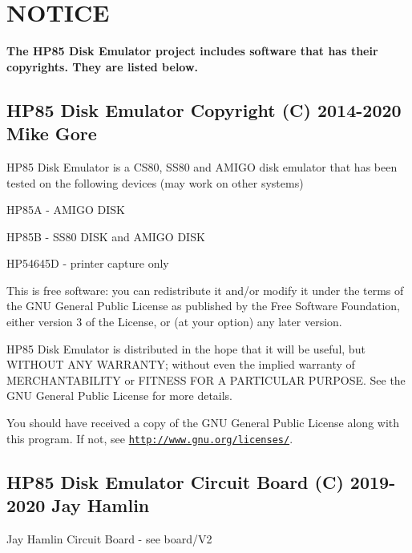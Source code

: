 \hypertarget{index_COPYRIGHT}{}\section{N\+O\+T\+I\+CE}\label{index_COPYRIGHT}
{\bfseries The H\+P85 Disk Emulator project includes software that has their copyrights. They are listed below.}





\subsection*{H\+P85 Disk Emulator Copyright (C) 2014-\/2020 Mike Gore}

H\+P85 Disk Emulator is a C\+S80, S\+S80 and A\+M\+I\+GO disk emulator that has been tested on the following devices (may work on other systems)
\begin{DoxyItemize}
\item H\+P85A -\/ A\+M\+I\+GO D\+I\+SK
\item H\+P85B -\/ S\+S80 D\+I\+SK and A\+M\+I\+GO D\+I\+SK
\item H\+P54645D -\/ printer capture only
\end{DoxyItemize}

This is free software\+: you can redistribute it and/or modify it under the terms of the G\+NU General Public License as published by the Free Software Foundation, either version 3 of the License, or (at your option) any later version.

H\+P85 Disk Emulator is distributed in the hope that it will be useful, but W\+I\+T\+H\+O\+UT A\+NY W\+A\+R\+R\+A\+N\+TY; without even the implied warranty of M\+E\+R\+C\+H\+A\+N\+T\+A\+B\+I\+L\+I\+TY or F\+I\+T\+N\+E\+SS F\+OR A P\+A\+R\+T\+I\+C\+U\+L\+AR P\+U\+R\+P\+O\+SE. See the G\+NU General Public License for more details.

You should have received a copy of the G\+NU General Public License along with this program. If not, see \href{http://www.gnu.org/licenses/}{\tt http\+://www.\+gnu.\+org/licenses/}.





\subsection*{H\+P85 Disk Emulator Circuit Board (C) 2019-\/2020 Jay Hamlin}


\begin{DoxyItemize}
\item Jay Hamlin Circuit Board -\/ see board/\+V2
\end{DoxyItemize}





